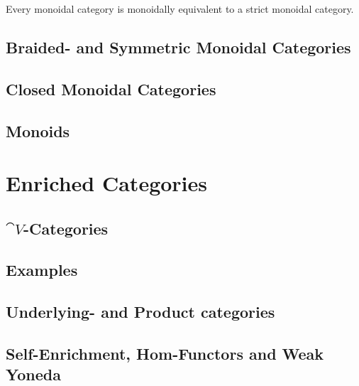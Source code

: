 	\begin{theorem}
		Every monoidal category is monoidally equivalent to a strict monoidal category.
	\end{theorem}

	\subsection{Braided- and Symmetric Monoidal Categories}
	\subsection{Closed Monoidal Categories}
	\subsection{Monoids}
	\newpage
	\section{Enriched Categories}
	\subsection{$\cat{V}$-Categories}
	\subsection{Examples}
	\subsection{Underlying- and Product categories}
	\subsection{Self-Enrichment, Hom-Functors and Weak Yoneda}
